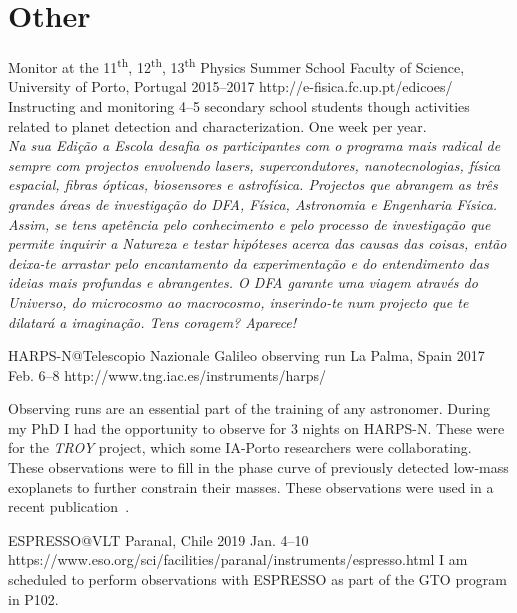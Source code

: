\section{Other}\label{app_sec:other}

{Monitor at the 11\textsuperscript{th}, 12\textsuperscript{th}, 13\textsuperscript{th} Physics Summer School}
{Faculty of Science, University of Porto, Portugal}%
{2015--2017}%
{http://e-fisica.fc.up.pt/edicoes/}%
{}%
{Instructing and monitoring 4--5 secondary school students though activities related to planet detection and characterization. One week per year.\\
  \emph{Na sua Edição a Escola desafia os participantes com o programa mais radical de sempre com projectos envolvendo lasers, supercondutores, nanotecnologias, física espacial, fibras ópticas, biosensores e astrofísica. Projectos que abrangem as três grandes áreas de investigação do DFA, Física, Astronomia e Engenharia Física. Assim, se tens apetência pelo conhecimento e pelo processo de investigação que permite inquirir a Natureza e testar hipóteses acerca das causas das coisas, então deixa-te arrastar pelo encantamento da experimentação e do entendimento das ideias mais profundas e abrangentes. O DFA garante uma viagem através do Universo, do microcosmo ao macrocosmo, inserindo-te num projecto que te dilatará a imaginação. Tens coragem? Aparece!}}%


{HARPS-N@Telescopio Nazionale Galileo observing run}
{La Palma, Spain}%
{2017 Feb. 6--8}%
{http://www.tng.iac.es/instruments/harps/}%
{}%
{Observing runs are an essential part of the training of any astronomer.
    During my PhD I had the opportunity to observe for 3 nights on HARPS-N. These were for the \emph{TROY} project, which some IA-Porto researchers were collaborating. These observations were to fill in the phase curve of previously detected low-mass exoplanets to further constrain their masses. These observations were used in a recent publication~\citet{lillo-box_troy_2018}.

}%


{ESPRESSO@VLT}
{Paranal, Chile} %
{2019 Jan. 4--10} %
{https://www.eso.org/sci/facilities/paranal/instruments/espresso.html}%
{}%
{I am scheduled to perform observations with ESPRESSO as part of the GTO program in P102.}
